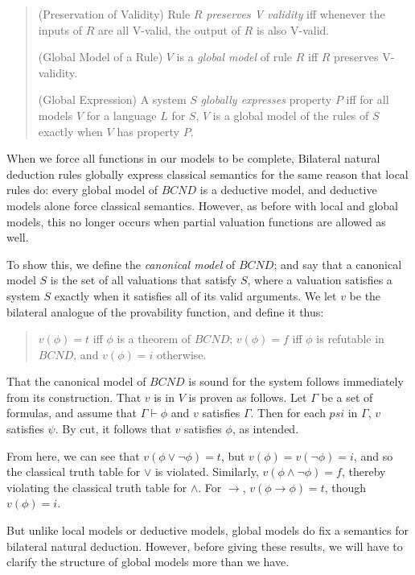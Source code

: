\documentclass[]{article}
\begin{document}
\begin{quote}
(Preservation of Validity) Rule $R$ \textit{preserves V validity} iff whenever the inputs of $R$ are all V-valid, the output of $R$ is also V-valid.

(Global Model of a Rule) $V$ is a \textit{global model} of rule $R$ iff $R$ preserves V-validity.

(Global Expression) A system $S$ \textit{globally expresses} property $P$ iff for all models $V$ for a language $L$ for $S$, $V$ is a global model of the rules of $S$ exactly when $V$ has property $P$.
\end{quote}

When we force all functions in our models to be complete, Bilateral natural deduction rules globally express classical semantics for the same reason that local rules do: every global model of $BCND$ is a deductive model, and deductive models alone force classical semantics. However, as before with local and global models, this no longer occurs when partial valuation functions are allowed as well. 

To show this, we define the \textit{canonical model} of $BCND$; and say that a canonical model $S$ is the set of all valuations that satisfy $S$, where a valuation satisfies a system $S$ exactly when it satisfies all of its valid arguments. We let $v$ be the bilateral analogue of the provability function, and define it thus:
\begin{quote}
$v(\phi) = t$ iff $\phi$ is a theorem of $BCND$; $v(\phi) = f$ iff $\phi$ is refutable in $BCND$, and $v(\phi) = i$ otherwise.
\end{quote}

That the canonical model of $BCND$ is sound for the system follows immediately from its construction. That $v$ is in $V$ is proven as follows. Let $\Gamma$ be a set of formulas, and assume that $\Gamma\vdash\phi$ and $v$ satisfies $\Gamma$. Then for each $psi$ in $\Gamma$, $v$ satisfies $\psi$. By cut, it follows that $v$ satisfies $\phi$, as intended.

From here, we can see that $v(\phi\vee\neg\phi) = t$, but $v(\phi) = v(\neg\phi) = i$, and so the classical truth table for $\vee$ is violated. Similarly, $v(\phi\wedge\neg\phi) = f$, thereby violating the classical truth table for $\wedge$. For $\rightarrow$, $v(\phi\rightarrow\phi) = t$, though $v(\phi) = i$. 

But unlike local models or deductive models, global models do fix a semantics for bilateral natural deduction. However, before giving these results, we will have to clarify the structure of global models more than we have.
\end{document}
